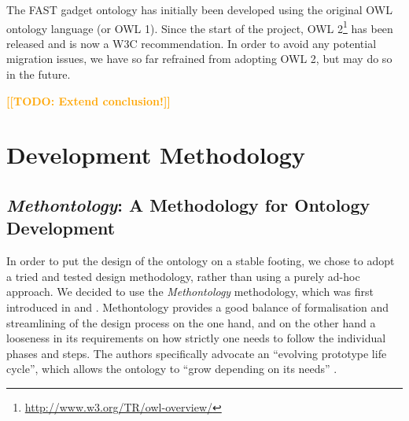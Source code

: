 \documentclass[twoside]{fast_latex}
\newcommand{\todo}[1]{\textsf{\textbf{\textcolor{Orange}{[[TODO: #1]]}}}}
\newcommand{\todo}[1]{}
\begin{document}
The FAST gadget ontology has initially been developed using the original OWL ontology language (or OWL 1). Since the start of the project, OWL 2\footnote{\url{http://www.w3.org/TR/owl-overview/}} has been released and is now a W3C recommendation. In order to avoid any potential migration issues, we have so far refrained from adopting OWL 2, but may do so in the future.

\todo{Extend conclusion!}


% 

\clearpage
{}
\appendix

\section{Development Methodology}

\subsection{\emph{Methontology}: A Methodology for Ontology Development} %
\label{sub:methontology_a_methodology_for_ontology_development}

In order to put the design of the ontology on a stable footing, we chose to adopt a tried and tested design methodology, rather than using a purely ad-hoc approach. We decided to use the \emph{Methontology} methodology, which was first introduced in \cite{gomez_perez1996conceptualise_ontologies} and \cite{fernandez1997methontology}. Methontology provides a good balance of formalisation and streamlining of the design process on the one hand, and on the other hand a looseness in its requirements on how strictly one needs to follow the individual phases and steps. The authors specifically advocate an ``evolving prototype life cycle'', which allows the ontology to ``grow depending on its needs'' \cite{fernandez1997methontology}.
\end{document}
